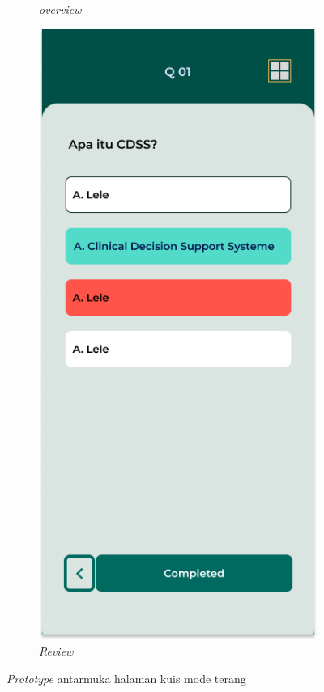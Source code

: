 \begin{figure}[H]
\begin{subfigure}[b]{0.23\textwidth}
	  \caption{\textit{overview}}
	  \label{fig:pilihNomor}
	\end{subfigure}
	\begin{subfigure}[b]{0.23\textwidth}
		\centering
	  \includegraphics[width=\linewidth]{contents/chapter-3/images/HF-kuis3.png}
	  \caption{\textit{Review}}
	  \label{fig:subjectScreen}
	\end{subfigure}
	\caption{\textit{Prototype} antarmuka halaman kuis mode terang}
	\label{Fig:HasilFeatureSetQuiz}
\end{figure}
